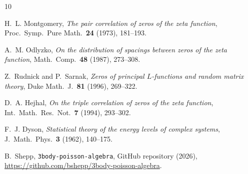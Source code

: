 \documentclass[11pt,a4paper]{article}
\begin{document}
\begin{thebibliography}{10}

H.~L. Montgomery, \emph{The pair correlation of zeros of the zeta function},
Proc.\ Symp.\ Pure Math.\ \textbf{24} (1973), 181--193.

A.~M. Odlyzko, \emph{On the distribution of spacings between zeros of the
zeta function}, Math.\ Comp.\ \textbf{48} (1987), 273--308.

Z.~Rudnick and P.~Sarnak, \emph{Zeros of principal $L$-functions and random
matrix theory}, Duke Math.\ J.\ \textbf{81} (1996), 269--322.

D.~A. Hejhal, \emph{On the triple correlation of zeros of the zeta function},
Int.\ Math.\ Res.\ Not.\ \textbf{7} (1994), 293--302.

F.~J. Dyson, \emph{Statistical theory of the energy levels of complex systems},
J.\ Math.\ Phys.\ \textbf{3} (1962), 140--175.

B.~Shepp, \texttt{3body-poisson-algebra}, GitHub repository (2026),
\url{https://github.com/bshepp/3body-poisson-algebra}.

\end{thebibliography}
\end{document}
